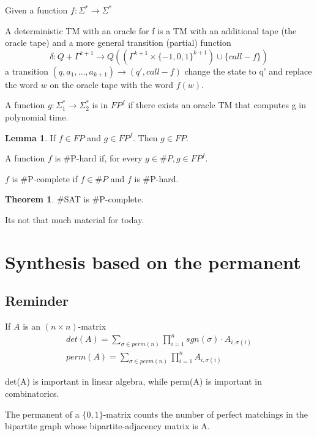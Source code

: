 \documentclass[a4paper,12pt]{article}
\theoremstyle{definition}
\newtheorem{lemma}[counter]{Lemma}
\newtheorem{theorem}[counter]{Theorem}
\theoremstyle{remark}
\begin{document}
Given a function $f: \Sigma^* \to \Sigma^*$

A deterministic TM with an oracle for f is a TM with an additional tape (the oracle tape) and a more general transition (partial) function
\begin{equation*}
    \delta: Q + \Gamma^{k+1} \to Q((\Gamma^{k+1} \times \{-1, 0, 1\}^{k+1}) \cup \{call-f\}) %
\end{equation*}
a transition $(q, a_1, \dots, a_{k+1}) \to (q', call-f)$
change the state to q' and replace the word $w$ on the oracle tape with the word $f(w)$.

A function $g: \Sigma_1^* \to \Sigma_2^*$ is in $FP^f$ if there exists an oracle TM 
that computes g in polynomial time.

\begin{lemma}
    If $f \in FP$ and $g \in FP^f$. Then $g \in FP$.
\end{lemma}

A function $f$ is $\#$P-hard if, for every $g \in \#P, g \in FP^f$.

$f$ is $\#$P-complete if $f \in \#P$ and $f$ is $\#$P-hard.

\begin{theorem}
    $\#$SAT is $\#$P-complete.
\end{theorem}






\newpage
Its not that much material for today.
\section{Synthesis based on the permanent}

\subsection*{Reminder}
If $A$ is an $(n \times n)$-matrix
\begin{gather*}
    det(A) = \sum_{\sigma \in perm(n)} \prod_{i = 1}^{n} sgn(\sigma) \cdot A_{i, \sigma(i)} \\
    perm(A) = \sum_{\sigma \in perm(n)} \prod_{i = 1}^{n} A_{i, \sigma(i)}
\end{gather*}

det(A) is important in linear algebra, while perm(A) is important in combinatorics.

The permanent of a $\{0, 1\}$-matrix counts the number of perfect matchings in the bipartite graph whose bipartite-adjacency matrix is A.
\end{document}
